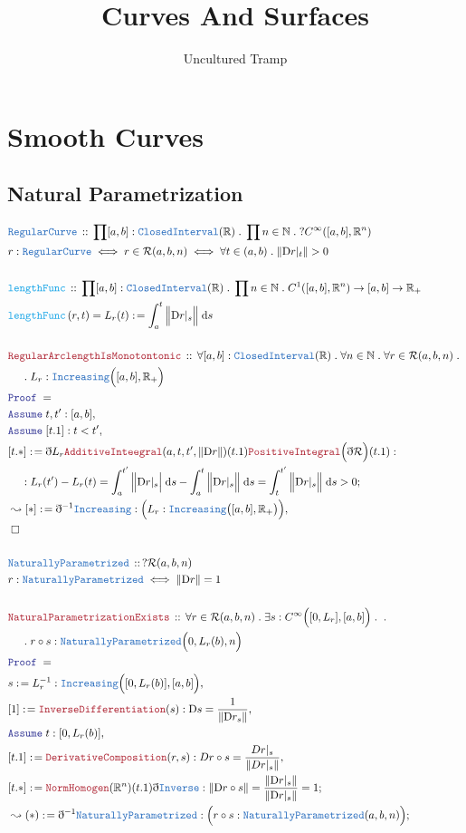 \documentclass[12pt]{scrartcl}
\author{Uncultured Tramp}
\title{Curves And Surfaces}
\newcommand{\TYPE}[1]{\textcolor{NavyBlue}{\mathtt{#1}}}
\newcommand{\FUNC}[1]{\textcolor{Cerulean}{\mathtt{#1}}}
\newcommand{\LOGIC}[1]{\textcolor{Blue}{\mathtt{#1}}}
\newcommand{\THM}[1]{\textcolor{Maroon}{\mathtt{#1}}}
\renewcommand{\.}{\; . \;}
\newcommand{\de}{: \kern 0.1pc =}
\newcommand{\Act}[1]{\left( #1 \right)}
\newcommand{\Theorem}[2]{& \THM{#1} \, :: \, #2 \\ & \Proof = \\ }
\newcommand{\DeclareType}[2]{& \TYPE{#1} \, :: \, #2 \\}
\newcommand{\DefineType}[3]{& #1 : \TYPE{#2} \iff #3 \\}
\newcommand{\DefineNamedType}[4]{& #1 : \TYPE{#2} \iff #3 \iff #4 \\}
\newcommand{\DeclareFunc}[2]{& \FUNC{#1} \, :: \, #2 \\}
\newcommand{\DefineNamedFunc}[4]{&  \FUNC{#1}\Act{#2} = #3 \de #4 \\}
\newcommand{\NewLine}{\\ & \kern 1pc}
\newcommand{\Page}[1]{ \begin{align*} #1 \end{align*}   }
\newcommand{ \bd }{ \ByDef }
\newcommand{\IntBy}{\; \mathrm{d}}
\newcommand{\Reals}{\mathbb{R} }
\newcommand{\Nat}{\mathbb{N} }
\newcommand{\Say}[3]{& #1 \de #2 : #3, \\}
\newcommand{\Conclude}[3]{& #1 \de #2 : #3; \\}
\newcommand{\Derive}[3]{& \leadsto #1 \de #2 : #3, \\}
\newcommand{\DeriveConclude}[3]{& \leadsto #1 \de #2 : #3 ; \\}
\newcommand{\A}{\LOGIC{Assume} \;}
\newcommand{\Assume}[2]{& \A #1 : #2, \\}
\newcommand{\QED}{\; \square}
\newcommand{\EndProof}{& \QED \\}
\newcommand{\ByDef}{\eth}
\newcommand{\Proof}{\LOGIC{Proof} \; }
\newcommand{\diff}{\mathrm{D}}
\newcommand{\NP}{\TYPE{NaturallyParametrized}}
\newcommand{\R}{\mathcal{R}}
\begin{document}
\maketitle
\newpage
\tableofcontents
\newpage
\section{Smooth Curves}
\subsection{Natural Parametrization}
\Page{  
	\DeclareType{RegularCurve}{\prod [a,b] : \TYPE{ClosedInterval}(\Reals) \. \prod n \in \Nat \.  ?C^\infty([a,b],\Reals^n)  }
	\DefineNamedType{r}{RegularCurve}{r \in \R(a,b,n)}{ \forall t \in (a,b) \.  \| \diff r |_t \| > 0 }
	\\
	\DeclareFunc{lengthFunc}{\prod [a,b] : \TYPE{ClosedInterval}(\Reals) \. \prod n \in \Nat \. C^1([a,b],\Reals^n) \to [a,b] \to \Reals_+ }
	\DefineNamedFunc{lengthFunc}{r,t}{L_r(t)}{ \int_a^t \Big\| \diff r|_s \Big\| \IntBy s  }
	\\ 
	\Theorem{RegularArclengthIsMonotontonic}{\forall [a,b] : \TYPE{ClosedInterval}(\Reals) \. \forall n \in \Nat \. 
		\forall r \in \R(a,b,n) \.  \NewLine \.L_r : \TYPE{Increasing}\Big([a,b],\Reals_+\Big) } 
	\Assume{t,t'}{[a,b]}
	\Assume{[t.1]}{t < t'}
	\Conclude{[t.*]}{\bd L_r\THM{AdditiveInteegral}(a,t,t',\| \diff r \|)(t.1)\THM{PositiveIntegral}\Big(\bd \R\Big)(t.1)}
	{
		\NewLine : 
		L_r(t') - L_r(t) = 
		\int^{t'}_a \Big\| \diff r|_s \Big| \IntBy s - \int^{t}_a \Big\| \diff r|_s\Big\| \IntBy s = 
		\int^{t'}_{t} \Big\| \diff r|_s \Big\| \IntBy s > 0   
	}
	\Derive{[*]}{\bd^{-1}\TYPE{Increasing}}{ \Big(L_r : \TYPE{Increasing}\big([a,b],\Reals_+\big)\Big)} 
	\EndProof
	\\
	\DeclareType{\NP}{?\R(a,b,n)}
	\DefineType{r}{\NP}{\| \diff r \| = 1}
	\\
	\Theorem{NaturalParametrizationExists}{ 
		\forall r \in \R(a,b,n) \.  
		\exists s : C^\infty\Big([0,L_r],[a,b] \Big) \. 
		\. \NewLine \. r \circ s : \NP\Big(0,L_r(b),n\Big)	
	}
	\Say{s}{L_r^{-1}}{\TYPE{Increasing}\Big([0,L_r(b)],[a,b]\Big)}
	\Say{[1]}{\THM{InverseDifferentiation}(s)}{\diff s = \frac{1}{\| \diff r_s \|}}
	\Assume{t}{[0,L_r(b)]}
	\Say{[t.1]}{\THM{DerivativeComposition}(r,s)}{D r \circ s = \frac{D r |_s}{\| D r|_s \|}}  
	\Conclude{[t.*]}{\THM{NormHomogen}(\Reals^n)(t.1)\bd \TYPE{Inverse}}{\| \diff r \circ s \| = \frac{\| \diff r|_s\|}{\| \diff r|_s\|} = 1}
	\DeriveConclude{(*)}{\bd^{-1}\NP}{\Big( r \circ s : \NP(a,b,n) \Big)}
}
\end{document}
